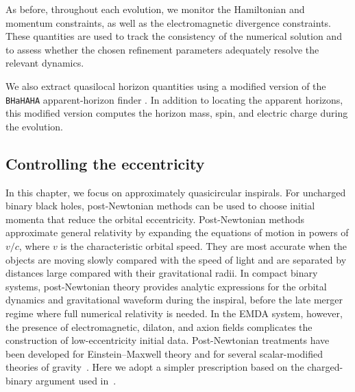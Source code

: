 As before, throughout each evolution, we monitor the Hamiltonian and momentum constraints, as well as the electromagnetic divergence constraints. These quantities are used to track the consistency of the numerical solution and to assess whether the chosen refinement parameters adequately resolve the relevant dynamics.

We also extract quasilocal horizon quantities using a modified version of the \texttt{BHaHAHA} apparent-horizon finder \cite{Etienne2026BHaHAHA}. In addition to locating the apparent horizons, this modified version computes the horizon mass, spin, and electric charge during the evolution.
\subsection{Controlling the eccentricity}
\label{sec:eccentricity_control}

In this chapter, we focus on approximately quasicircular inspirals. For uncharged binary black holes, post-Newtonian methods can be used to choose initial momenta that reduce the orbital eccentricity.  Post-Newtonian methods approximate general relativity by expanding the equations of motion in powers of $v/c$, where $v$ is the characteristic orbital speed. They are most accurate when the objects are moving slowly compared with the speed of light and are separated by distances large compared with their gravitational radii. In compact binary systems, post-Newtonian theory provides analytic expressions for the orbital dynamics and gravitational waveform during the inspiral, before the late merger regime where full numerical relativity is needed. In the EMDA system, however, the presence of electromagnetic, dilaton, and axion fields complicates the construction of low-eccentricity initial data. Post-Newtonian treatments have been developed for Einstein--Maxwell theory and for several scalar-modified theories of gravity~\cite{Khalil2018_EMD_EOB,Yagi2012_QuadraticGravityPN,Julie2019_EsGB_PN,Gupta2025_EinsteinMaxwell2PN}. Here we adopt a simpler prescription based on the charged-binary argument used in~\cite{Bozzola2021}.

